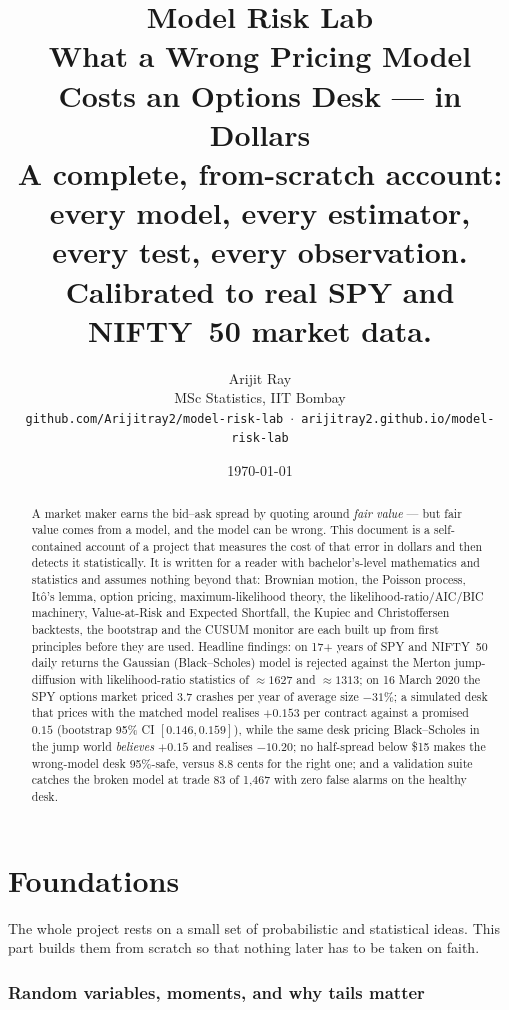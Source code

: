 \documentclass[11pt,a4paper]{article}
\title{\vspace{-1.4cm}\textbf{Model Risk Lab}\\[4pt]
\Large What a Wrong Pricing Model Costs an Options Desk --- in Dollars\\[6pt]
\normalsize A complete, from-scratch account: every model, every estimator, every
test, every observation.\\
Calibrated to real SPY and NIFTY~50 market data.}
\author{Arijit Ray\\ \small MSc Statistics, IIT Bombay\\
\small \texttt{github.com/Arijitray2/model-risk-lab} \,$\cdot$\,
\texttt{arijitray2.github.io/model-risk-lab}}
\date{\today}
\begin{document}
\maketitle

\begin{abstract}
\noindent
A market maker earns the bid--ask spread by quoting around \emph{fair value} ---
but fair value comes from a model, and the model can be wrong. This document is a
self-contained account of a project that measures the cost of that error in
dollars and then detects it statistically. It is written for a reader with
bachelor's-level mathematics and statistics and assumes nothing beyond that:
Brownian motion, the Poisson process, It\^o's lemma, option pricing,
maximum-likelihood theory, the likelihood-ratio/AIC/BIC machinery, Value-at-Risk
and Expected Shortfall, the Kupiec and Christoffersen backtests, the bootstrap and
the CUSUM monitor are each built up from first principles before they are used.
Headline findings: on 17+ years of SPY and NIFTY~50 daily returns the Gaussian
(Black--Scholes) model is rejected against the Merton jump-diffusion with
likelihood-ratio statistics of $\approx 1627$ and $\approx 1313$; on 16 March 2020
the SPY options market priced $3.7$ crashes per year of average size $-31\%$; a
simulated desk that prices with the matched model realises $+0.153$ per contract
against a promised $0.15$ (bootstrap 95\% CI $[0.146,0.159]$), while the same desk
pricing Black--Scholes in the jump world \emph{believes} $+0.15$ and realises
$-10.20$; no half-spread below \$15 makes the wrong-model desk 95\%-safe, versus
8.8 cents for the right one; and a validation suite catches the broken model at
trade 83 of 1{,}467 with zero false alarms on the healthy desk.
\end{abstract}

\tableofcontents
\newpage

\part{Foundations}
\label{part:foundations}

The whole project rests on a small set of probabilistic and statistical ideas.
This part builds them from scratch so that nothing later has to be taken on faith.

\section{Random variables, moments, and why tails matter}
\end{document}
